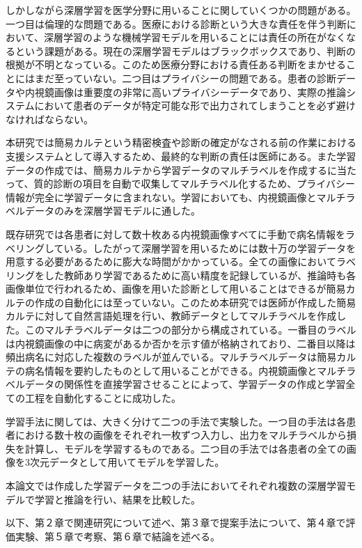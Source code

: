 しかしながら深層学習を医学分野に用いることに関していくつかの問題がある。一つ目は倫理的な問題である。医療における診断という大きな責任を伴う判断において、深層学習のような機械学習モデルを用いることには責任の所在がなくなるという課題がある。現在の深層学習モデルはブラックボックスであり、判断の根拠が不明となっている。このため医療分野における責任ある判断をまかせることにはまだ至っていない。二つ目はプライバシーの問題である。患者の診断データや内視鏡画像は重要度の非常に高いプライバシーデータであり、実際の推論システムにおいて患者のデータが特定可能な形で出力されてしまうことを必ず避けなければならない。

本研究では簡易カルテという精密検査や診断の確定がなされる前の作業における支援システムとして導入するため、最終的な判断の責任は医師にある。また学習データの作成では、簡易カルテから学習データのマルチラベルを作成するに当たって、質的診断の項目を自動で収集してマルチラベル化するため、プライバシー情報が完全に学習データに含まれない。学習においても、内視鏡画像とマルチラベルデータのみを深層学習モデルに通した。

既存研究では各患者に対して数十枚ある内視鏡画像すべてに手動で病名情報をラベリングしている。したがって深層学習を用いるためには数十万の学習データを用意する必要があるために膨大な時間がかかっている。全ての画像においてラベリングをした教師あり学習であるために高い精度を記録しているが、推論時も各画像単位で行われるため、画像を用いた診断として用いることはできるが簡易カルテの作成の自動化には至っていない。このため本研究では医師が作成した簡易カルテに対して自然言語処理を行い、教師データとしてマルチラベルを作成した。このマルチラベルデータは二つの部分から構成されている。一番目のラベルは内視鏡画像の中に病変があるか否かを示す値が格納されており、二番目以降は頻出病名に対応した複数のラベルが並んでいる。マルチラベルデータは簡易カルテの病名情報を要約したものとして用いることができる。内視鏡画像とマルチラベルデータの関係性を直接学習させることによって、学習データの作成と学習全ての工程を自動化することに成功した。

学習手法に関しては、大きく分けて二つの手法で実験した。一つ目の手法は各患者における数十枚の画像をそれぞれ一枚ずつ入力し、出力をマルチラベルから損失を計算し、モデルを学習するものである。二つ目の手法では各患者の全ての画像を3次元データとして用いてモデルを学習した。

本論文では作成した学習データを二つの手法においてそれぞれ複数の深層学習モデルで学習と推論を行い、結果を比較した。

以下、第２章で関連研究について述べ、第３章で提案手法について、第４章で評価実験、第５章で考察、第６章で結論を述べる。
